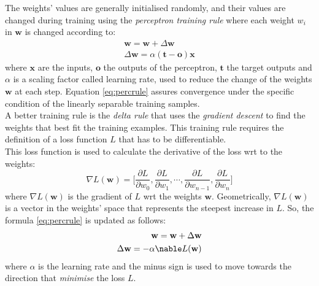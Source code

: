 The weights' values are generally initialised randomly, and their values are changed during training using the \emph{perceptron training rule} where each weight $w_i$ in $\textbf{w}$ is changed according to:
\begin{equation} \label{eq:percrule}
    \begin{aligned}
        \textbf{w} = \textbf{w} + \Delta \textbf{w}\\
        \Delta \textbf{w} = \alpha (\textbf{t}-\textbf{o})\textbf{x}
    \end{aligned}
\end{equation}
\noindent where $\textbf{x}$ are the inputs, $\textbf{o}$ the outputs of the perceptron, $\textbf{t}$ the target outputs and $\alpha$ is a scaling factor called learning rate, used to reduce the change of the weights $\textbf{w}$ at each step. Equation \ref{eq:percrule} assures convergence under the specific condition of the linearly separable training samples.\\

A better training rule is the \emph{delta rule} that uses the \emph{gradient descent} to find the weights that best fit the training examples. This training rule requires the definition of a loss function $L$ that has to be differentiable.\\
This loss function is used to calculate the derivative of the loss \gls{wrt} to the weights:
\begin{equation} \label{eq:chainrule}
    \nabla L(\textbf{w}) = \Big[ 
                \frac{\partial L}{\partial w_0},
                \frac{\partial L}{\partial w_1},
                \cdots,
                \frac{\partial L}{\partial w_{n-1}},
                \frac{\partial L}{\partial w_n}
                        \Big]
\end{equation}
\noindent where $\nabla L(\textbf{w})$ is the gradient of $L$ \gls{wrt} the weights $\textbf{w}$. Geometrically, $\nabla L(\textbf{w})$ is a vector in the weights' space that represents the steepest increase in $L$. So, the formula \ref{eq:percrule} is updated as follows:
\begin{equation*}
    \begin{aligned}
        \textbf{w} = \textbf{w} + \Delta \textbf{w}\\
        \Delta \textbf{w} = -\alpha \nable L(\textbf{w})
    \end{aligned}
\end{equation*}
\noindent where $\alpha$ is the learning rate and the minus sign is used to move towards the direction that \emph{minimise} the loss $L$.\\

